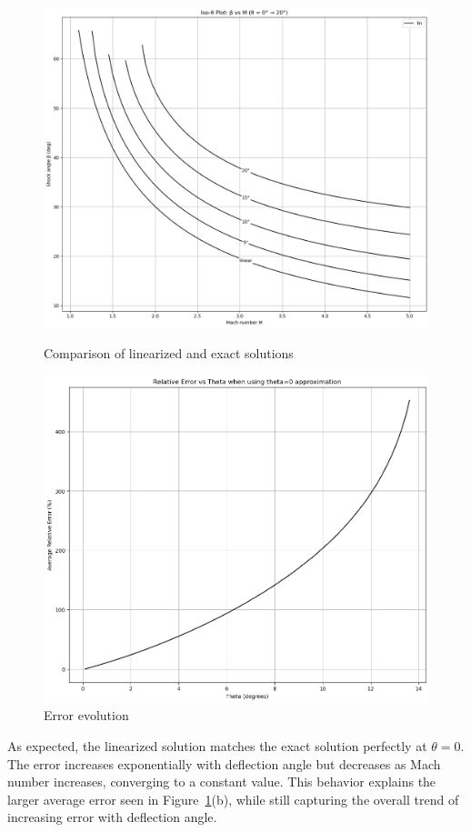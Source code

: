 \begin{figure}[H]
    \centering
    \begin{minipage}[b]{0.45\linewidth}
        \centering
        \includegraphics[width=\linewidth]{ressources/figures/linear_comparaison.png}
        \caption{Comparison of linearized and exact solutions}
    \end{minipage}
    \hfill
    \begin{minipage}[b]{0.45\linewidth}
        \centering
        \includegraphics[width=\linewidth]{ressources/figures/linear_error.png}
        \caption{Error evolution}
    \end{minipage}
    \label{fig:linear_comparaison}
\end{figure}

As expected, the linearized solution matches the exact solution perfectly at \(\theta = 0\). The error increases exponentially with deflection angle but decreases as Mach number increases, converging to a constant value. This behavior explains the larger average error seen in Figure~\ref{fig:linear_comparaison}(b), while still capturing the overall trend of increasing error with deflection angle.

